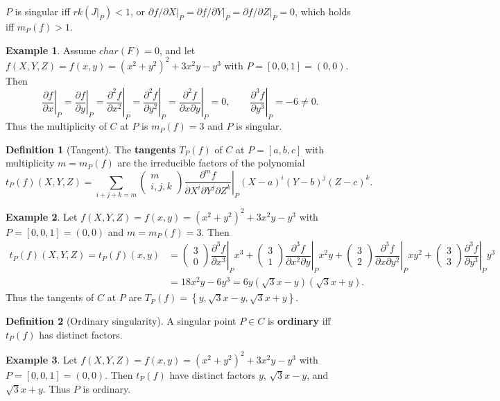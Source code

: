 \documentclass{article}
\newcommand{\val}[1]{\left. #1 \right\rvert}
\newcommand{\rb}[1]{\left( #1 \right)}
\renewcommand{\sb}[1]{\left[ #1 \right]}
\newcommand{\cb}[1]{\left\{ #1 \right\}}
\newcommand{\twobyone}[2]{\begin{pmatrix} #1 \\ #2 \end{pmatrix}}
\theoremstyle{definition}
\newtheorem*{definition}{Definition}
\newtheorem*{example}{Example}
\begin{document}
$ P $ is singular iff $ rk\rb{\val{J}_P} < 1 $, or $ \val{\partial f / \partial X}_P = \val{\partial f / \partial Y}_P = \val{\partial f / \partial Z}_P = 0 $, which holds iff $ m_P\rb{f} > 1 $.

\begin{example}
Assume $ char\rb{F} = 0 $, and let $ f\rb{X, Y, Z} = f\rb{x, y} = \rb{x^2 + y^2}^2 + 3x^2y - y^3 $ with $ P = \sb{0, 0, 1} = \rb{0, 0} $. Then
$$ \val{\dfrac{\partial f}{\partial x}}_P = \val{\dfrac{\partial f}{\partial y}}_P = \val{\dfrac{\partial^2 f}{\partial x^2}}_P = \val{\dfrac{\partial^2 f}{\partial y^2}}_P = \val{\dfrac{\partial^2 f}{\partial x \partial y}}_P = 0, \qquad \val{\dfrac{\partial^3 f}{\partial y^3}}_P = -6 \ne 0. $$
Thus the multiplicity of $ C $ at $ P $ is $ m_P\rb{f} = 3 $ and $ P $ is singular.
\end{example}

\begin{definition}[Tangent]
The \textbf{tangents} $ T_P\rb{f} $ of $ C $ at $ P = \sb{a, b, c} $ with multiplicity $ m = m_P\rb{f} $ are the irreducible factors of the polynomial
$$ t_P\rb{f}\rb{X, Y, Z} = \sum_{i + j + k = m} \twobyone{m}{i, j, k} \val{\dfrac{\partial^m f}{\partial X^i \partial Y^j \partial Z^k}}_P \rb{X - a}^i \rb{Y - b}^j \rb{Z - c}^k. $$
\end{definition}

\begin{example}
Let $ f\rb{X, Y, Z} = f\rb{x, y} = \rb{x^2 + y^2}^2 + 3x^2y - y^3 $ with $ P = \sb{0, 0, 1} = \rb{0, 0} $ and $ m = m_P\rb{f} = 3 $. Then
\begin{align*}
t_P\rb{f}\rb{X, Y, Z} = t_P\rb{f}\rb{x, y}
& = \twobyone{3}{0}\val{\dfrac{\partial^3 f}{\partial x^3}}_Px^3 + \twobyone{3}{1}\val{\dfrac{\partial^3 f}{\partial x^2 \partial y}}_Px^2y + \twobyone{3}{2}\val{\dfrac{\partial^3 f}{\partial x \partial y^2}}_Pxy^2 + \twobyone{3}{3}\val{\dfrac{\partial^3 f}{\partial y^3}}_Py^3 \\
& = 18x^2y - 6y^3 = 6y\rb{\sqrt{3}x - y}\rb{\sqrt{3}x + y}.
\end{align*}
Thus the tangents of $ C $ at $ P $ are $ T_P\rb{f} = \cb{y, \sqrt{3}x - y, \sqrt{3}x + y} $.
\end{example}

\begin{definition}[Ordinary singularity]
A singular point $ P \in C $ is \textbf{ordinary} iff $ t_P\rb{f} $ has distinct factors.
\end{definition}

\begin{example}
Let $ f\rb{X, Y, Z} = f\rb{x, y} = \rb{x^2 + y^2}^2 + 3x^2y - y^3 $ with $ P = \sb{0, 0, 1} = \rb{0, 0} $. Then $ t_P\rb{f} $ have distinct factors $ y $, $ \sqrt{3}x - y $, and $ \sqrt{3}x + y $. Thus $ P $ is ordinary.
\end{example}
\end{document}
